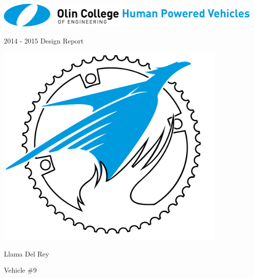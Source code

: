 %
%
%



\thispagestyle{empty}

\setmainfont{DINOT}

\begin{centering}



\vspace{12pt}
\includegraphics[height = 0.5in]{OlinHPV.pdf}
\par
\vspace{.15in}
{\Large 2014 - 2015 Design Report}
\vspace{.3in}
\par
\includegraphics[height=4in]{CogLogo.pdf}
\par
\vspace{.125in}
	{\Huge Llama Del Rey}
\par
\vspace{5pt}
{\Large Vehicle \#9} \par


\end{centering}
